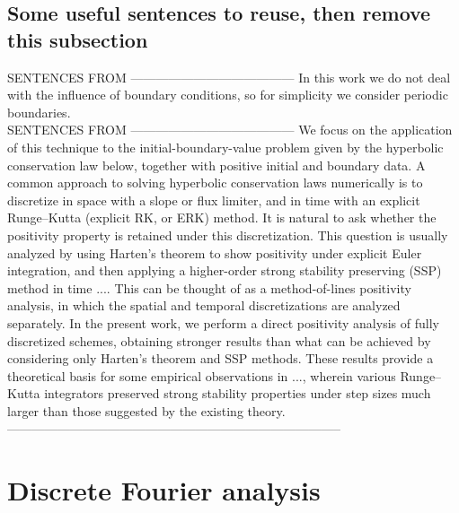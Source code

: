 \documentclass[a4paper]{article}
\begin{document}
\subsection{Some useful sentences to reuse, then remove this subsection}
SENTENCES FROM \cite{posconv}---------------------------------------
In this work we do not deal with the influence of boundary conditions, so for simplicity
we consider periodic boundaries.\\
SENTENCES FROM \cite{posconv}---------------------------------------
We focus on the application of this technique to the initial-boundary-value problem given
by the hyperbolic conservation law below, together with positive initial and boundary data.
A common approach to solving hyperbolic conservation laws numerically is to discretize in
space with a slope or flux limiter, and in time with an explicit Runge--Kutta (explicit RK,
or ERK) method. It is natural to ask whether the positivity property is retained under this
discretization. This question is usually analyzed by using Harten's theorem
to show positivity under explicit Euler integration, and then applying a higher-order strong
stability preserving (SSP) method in time .... This can be thought of as a method-of-lines
positivity analysis, in which the spatial and temporal discretizations are analyzed separately.
In the present work, we perform a direct positivity analysis of fully discretized schemes,
obtaining stronger results than what can be achieved by considering only Harten's theorem
and SSP methods. These results provide a theoretical basis for some empirical observations in
..., wherein various Runge--Kutta integrators preserved strong stability properties under
step sizes much larger than those suggested by the existing theory.
--------------------------------------------------------------------------------\\




\section{Discrete Fourier analysis}\label{sectiondiscFourier}
\\
\end{document}
